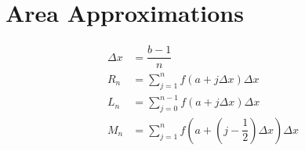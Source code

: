 \documentclass{siproblemset}
\begin{document}
    \section{Area Approximations}
    \begin{align*}
        \Delta x &= \dfrac{b-1}{n} \\
        R_n &= \sum_{j=1}^{n} f\left(a + j \Delta x\right) \Delta x \\
        L_n &= \sum_{j=0}^{n - 1} f\left(a + j \Delta x\right) \Delta x \\
        M_n &= \sum_{j=1}^{n} f\left(a + \left(j - \dfrac{1}{2}\right) \Delta x\right) \Delta x \\
    \end{align*}
\end{document}
